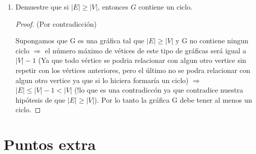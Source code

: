 \documentclass{article}
\begin{document}
\begin{enumerate}
  \textit{\textbf{Soluci\'on:}}
  \begin{itemize}
  \item[$k = 0$)] Son todas las gráficas que no tienen aristas, a estas se les conoce
    como g\'aficas vac\'ias.
  \item[$k = 1$)] Estas son gr\'aficas con una cantidad de v\'ertices par y son tantas
    uniones de $P_2$ como $\frac{|V_G|}{2}$. Las gráficas con $|V_G|$ impar no entran
    aqu\'i porque siempre habr\'a $(|V_G| - 1) P_2$ y alg\'un v\'ertice (aislado) será
    de grado igual a $0$!! (o, pensando en lazos, de grado igual a 2), lo que contradice
    el ser $1-$regular.
  \item[$k = 2$)] Son gr\'aficas que contienen ciclos o son combinaciones de ciclos.
    Todos los ciclos son $2-$regulares, esto no implica que todas las gr\'aficas
    $2-$regulares sean un ciclo pero si que los contengan o que sean combinaciones
    de estos.
  \end{itemize}
  Con los $3$ puntos anteriores concluimos la caracterización. \hfill $\square$
\item Demuestre que si $|E| \ge |V|$, entonces $G$ contiene un ciclo.

\begin{proof} (Por contradicción)

  Supongamos que G es una gráfica tal que $|E|\geq|V|$ y G no contiene ningun ciclo $\Longrightarrow$ el número máximo de vétices de este tipo de gráficas será igual a $|V|-1$ (Ya que todo vértice se podria relacionar con algun otro vertice sin repetir con los vértices anteriores, pero el último no se podra relacionar con algun otro vertice ya que si lo hiciera formaría un ciclo) $\Longrightarrow$ $|E|\leq|V|-1 < |V|$ (!lo que es una contradiccón ya que contradice nuestra hipótesis de que $|E|\geq|V|$). Por lo tanto la gráfica G debe tener al menos un ciclo.

  \end{proof}
\end{enumerate}

\section*{Puntos extra}
\end{document}

